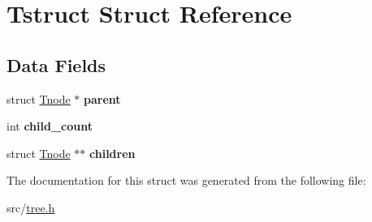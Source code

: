 \hypertarget{structTstruct}{\section{Tstruct Struct Reference}
\label{structTstruct}
}
\subsection*{Data Fields}
\begin{DoxyCompactItemize}
\item 
\hypertarget{structTstruct_aac64de7eb6800e82921bf6b0b5a2c032}{struct \hyperlink{structTnode}{Tnode} $\ast$ {\bfseries parent}}\label{structTstruct_aac64de7eb6800e82921bf6b0b5a2c032}

\item 
\hypertarget{structTstruct_a06389e737e6915fe6bd549dac5ae353a}{int {\bfseries child\+\_\+count}}\label{structTstruct_a06389e737e6915fe6bd549dac5ae353a}

\item 
\hypertarget{structTstruct_a8256bd77b4466c4fade0766864cf5f26}{struct \hyperlink{structTnode}{Tnode} $\ast$$\ast$ {\bfseries children}}\label{structTstruct_a8256bd77b4466c4fade0766864cf5f26}

\end{DoxyCompactItemize}


The documentation for this struct was generated from the following file\+:\begin{DoxyCompactItemize}
\item 
src/\hyperlink{tree_8h}{tree.\+h}\end{DoxyCompactItemize}
